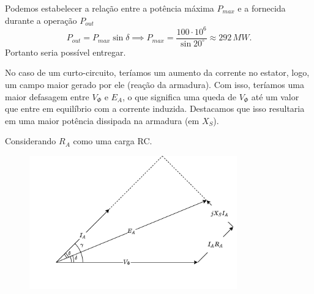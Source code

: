 \documentclass[a4paper]{report}
\begin{document}

Podemos estabelecer a relação entre a potência máxima $P_{max}$ e a fornecida durante a operação $P_{out}$ \[
P_{out} = P_{max} \sin \delta \implies P_{max} = \frac{100\cdot 10^6}{\sin 20^{\circ}} \approx 292\,MW
.\] Portanto seria possível entregar.


No caso de um curto-circuito, teríamos um aumento da corrente no estator, logo, um campo maior gerado por ele (reação da armadura). Com isso, teríamos uma maior defasagem entre $V_{\Phi}$ e $E_A$, o que significa uma queda de $V_{\Phi}$ até um valor que entre em equilíbrio com a corrente induzida. Destacamos que isso resultaria em uma maior potência dissipada na armadura (em $X_S$).


Considerando $R_A$ como uma carga RC.
\begin{figure}[H]
    \centering
    \includegraphics[width=0.8\textwidth]{figures/2-2_7.png}
\end{figure}
\end{document}
